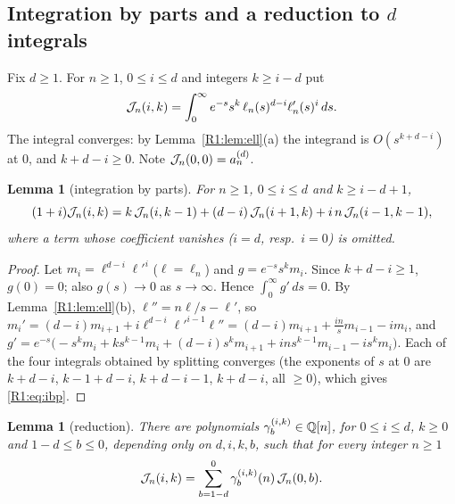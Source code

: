 \documentclass[11pt]{amsart}
\newtheorem{lemma}[theorem]{Lemma}
\theoremstyle{definition}
\theoremstyle{remark}
\begin{document}
\subsection{Integration by parts and a reduction to \texorpdfstring{$d$}{d} integrals}\label{R1:sec:reduction}

Fix $d\ge1$. For $n\ge1$, $0\le i\le d$ and integers $k\ge i-d$ put
\[
\mathcal{J}_n(i,k)=\int_0^\infty e^{-s}s^k\,\ell_n(s)^{d-i}\ell_n'(s)^i\,ds .
\]
The integral converges: by Lemma~\ref{R1:lem:ell}(a) the integrand is
$O(s^{k+d-i})$ at $0$, and $k+d-i\ge0$. Note $\mathcal{J}_n(0,0)=a^{(d)}_n$.

\begin{lemma}[integration by parts]\label{R1:lem:ibp}
For $n\ge1$, $0\le i\le d$ and $k\ge i-d+1$,
\begin{equation}\label{R1:eq:ibp}
(1+i)\mathcal{J}_n(i,k)=k\,\mathcal{J}_n(i,k-1)+(d-i)\,\mathcal{J}_n(i+1,k)+i\,n\,\mathcal{J}_n(i-1,k-1),
\end{equation}
where a term whose coefficient vanishes ($i=d$, resp.\ $i=0$) is omitted.
\end{lemma}

\begin{proof}
Let $m_i=\ell^{d-i}\ell'^i$ ($\ell=\ell_n$) and $g=e^{-s}s^km_i$. Since $k+d-i\ge1$,
$g(0)=0$; also $g(s)\to0$ as $s\to\infty$. Hence $\int_0^\infty g'\,ds=0$. By
Lemma~\ref{R1:lem:ell}(b), $\ell''=n\ell/s-\ell'$, so
$m_i'=(d-i)m_{i+1}+i\ell^{d-i}\ell'^{i-1}\ell''=(d-i)m_{i+1}+\frac{in}{s}m_{i-1}-im_i$, and
$g'=e^{-s}\bigl(-s^km_i+ks^{k-1}m_i+(d-i)s^km_{i+1}+ins^{k-1}m_{i-1}-is^km_i\bigr)$. Each of
the four integrals obtained by splitting converges (the exponents of $s$ at $0$ are
$k+d-i$, $k-1+d-i$, $k+d-i-1$, $k+d-i$, all $\ge0$), which gives \eqref{R1:eq:ibp}.
\end{proof}

\begin{lemma}[reduction]\label{R1:lem:reduction}
There are polynomials $\gamma^{(i,k)}_b\in\mathbb{Q}[n]$, for $0\le i\le d$, $k\ge0$ and
$1-d\le b\le0$, depending only on $d,i,k,b$, such that for every integer $n\ge1$
\[
\mathcal{J}_n(i,k)=\sum_{b=1-d}^{0}\gamma^{(i,k)}_b(n)\,\mathcal{J}_n(0,b).
\]
\end{lemma}
\end{document}

